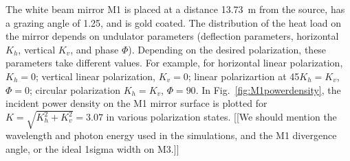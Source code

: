\documentclass[preprint]{iucr}
\begin{document}
The white beam mirror M1 is placed at a distance 13.73~m from the source, has a grazing angle of 1.25\textdegree, and is gold coated. The distribution of the heat load on the mirror depends on undulator parameters (deflection parameters, horizontal $K_h$, vertical $K_v$, and phase $\Phi$). Depending on the desired polarization, these parameters take different values. For example, for horizontal linear polarization, $K_h=0$; vertical linear polarization, $K_v=0$; linear polarizartion at 45\textdegree $K_h=K_v$, $\Phi=0$; circular polarization $K_h=K_v$, $\Phi=90$\textdegree. In Fig.~\ref{fig:M1powerdensity}, the incident power density on the M1 mirror surface is plotted for $K=\sqrt{K_h^2 + K_v^2}=3.07$ in various polarization states. [[We should mention the wavelength and photon energy used in the simulations, and the M1 divergence angle, or the ideal 1sigma width on M3.]]
\end{document}
